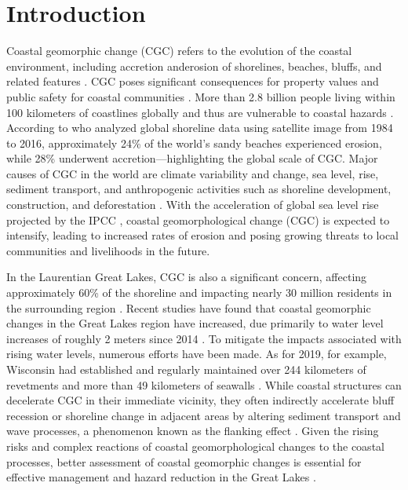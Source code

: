 \section{Introduction} 
\label{Introduction} 
Coastal geomorphic change (CGC) refers to the evolution of the coastal
environment, including accretion anderosion of shorelines, beaches, bluffs, and
related features \citep{vitousek2024scalable}. CGC poses significant consequences for
property values and public safety for coastal communities \citep{allen2019linking}.
More than 2.8 billion people living within 100 kilometers of coastlines globally
and thus are vulnerable to coastal hazards \citep{martinez2007coasts,
cosby_accelerating_2024}.  According to \citet{luijendijk_state_2018} who
analyzed global shoreline data using satellite image from 1984 to 2016,
approximately 24\% of the world’s sandy beaches experienced erosion, while 28\%
underwent accretion—highlighting the global scale of CGC. Major causes of CGC in
the world are climate variability and change, sea level, rise, sediment
transport, and anthropogenic activities such as shoreline development,
construction, and deforestation \citep{mangor2004shoreline}.  With the acceleration of
global sea level rise projected by the IPCC \citep{siegert2020twenty}, coastal
geomorphological change (CGC) is expected to intensify, leading to increased
rates of erosion and posing growing threats to local communities and livelihoods
in the future.  

In the Laurentian Great Lakes, CGC is also a significant concern, affecting
approximately 60\% of the shoreline and impacting nearly 30 million residents in
the surrounding region
\citep{mickelson1977shoreline,mickelson2004erosion,brown_factors_2005,jackson_coastal_2013}.
Recent studies have found that coastal geomorphic changes in the Great Lakes
region have increased, due primarily to water level increases of roughly 2
meters since 2014 \citep{gronewold_hydrological_2016,gronewold_tug--war_2021}.
To mitigate the impacts associated with rising water levels, numerous efforts
have been made. As for 2019, for example, Wisconsin had established and
regularly maintained over 244 kilometers of revetments and more than 49
kilometers of seawalls \citep{mickelson2007wisconsin}. While coastal structures
can decelerate CGC in their immediate vicinity, they often indirectly accelerate
bluff recession or shoreline change in adjacent areas by altering sediment
transport and wave processes, a phenomenon known as the flanking effect
\citep{brown2012human,lin_field_2014}. Given the rising risks and complex
reactions of coastal geomorphological changes to the coastal processes, better
assessment of coastal geomorphic changes is essential for effective management
and hazard reduction in the Great Lakes \citep{lawrence1994natural}.

